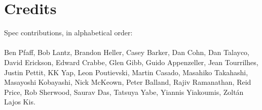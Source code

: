 \section{Credits}

Spec contributions, in alphabetical order:
\\\\
Ben Pfaff,
Bob Lantz,
Brandon Heller,
Casey Barker,
Dan Cohn,
Dan Talayco,
David Erickson,
Edward Crabbe,
Glen Gibb,
Guido Appenzeller,
Jean Tourrilhes,
Justin Pettit,
KK Yap,
Leon Poutievski,
Martin Casado,
Masahiko Takahashi,
Masayoshi Kobayashi,
Nick McKeown,
Peter Balland,
Rajiv Ramanathan,
Reid Price,
Rob Sherwood,
Saurav Das,
Tatsuya Yabe,
Yiannis Yiakoumis,
Zolt\'{a}n Lajos Kis.
